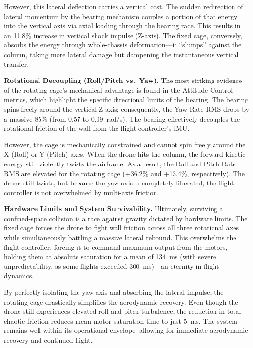 However, this lateral deflection carries a vertical cost. The sudden redirection of lateral momentum by the bearing mechanism couples a portion of that energy into the vertical axis via axial loading through the bearing race. This results in an 11.8\% increase in vertical shock impulse (Z-axis). The fixed cage, conversely, absorbs the energy through whole-chassis deformation---it ``slumps'' against the column, taking more lateral damage but dampening the instantaneous vertical transfer.

\medskip
\noindent\textbf{Rotational Decoupling (Roll/Pitch vs.\ Yaw).}
The most striking evidence of the rotating cage's mechanical advantage is found in the Attitude Control metrics, which highlight the specific directional limits of the bearing. The bearing spins freely around the vertical Z-axis; consequently, the Yaw Rate RMS drops by a massive 85\% (from 0.57 to 0.09~rad/s). The bearing effectively decouples the rotational friction of the wall from the flight controller's IMU.

However, the cage is mechanically constrained and cannot spin freely around the X (Roll) or Y (Pitch) axes. When the drone hits the column, the forward kinetic energy still violently twists the airframe. As a result, the Roll and Pitch Rate RMS are elevated for the rotating cage (+36.2\% and +13.4\%, respectively). The drone still twists, but because the yaw axis is completely liberated, the flight controller is not overwhelmed by multi-axis friction.

\medskip
\noindent\textbf{Hardware Limits and System Survivability.}
Ultimately, surviving a confined-space collision is a race against gravity dictated by hardware limits. The fixed cage forces the drone to fight wall friction across all three rotational axes while simultaneously battling a massive lateral rebound. This overwhelms the flight controller, forcing it to command maximum output from the motors, holding them at absolute saturation for a mean of 134~ms (with severe unpredictability, as some flights exceeded 300~ms)---an eternity in flight dynamics.

By perfectly isolating the yaw axis and absorbing the lateral impulse, the rotating cage drastically simplifies the aerodynamic recovery. Even though the drone still experiences elevated roll and pitch turbulence, the reduction in total chaotic friction reduces mean motor saturation time to just 5~ms. The system remains well within its operational envelope, allowing for immediate aerodynamic recovery and continued flight.

